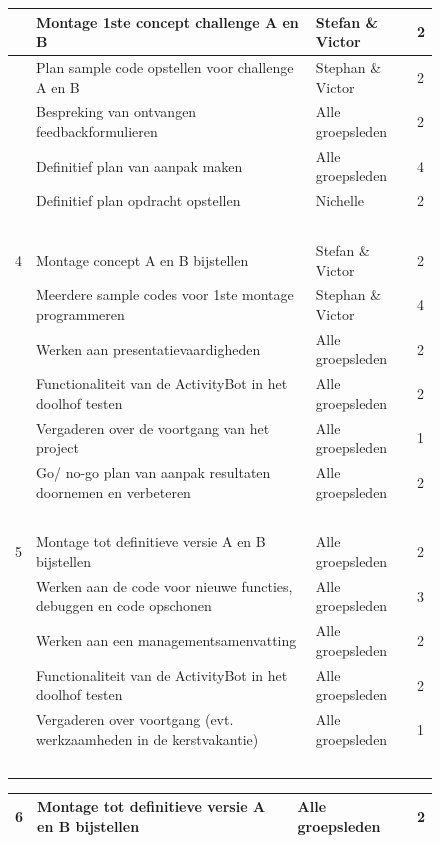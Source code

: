 \documentclass[oneside]{book}
\begin{document}
{\begin{figure}[H]
\begin{adjustwidth}{-4.25cm}{}
\begin{tabular}{ | l | l | l | l | }
	 & Montage 1ste concept challenge A en B & Stefan \& Victor & 2 \\ \hline
	 & Plan sample code opstellen voor challenge A en B & Stephan \& Victor & 2 \\ \hline
	 & Bespreking van ontvangen feedbackformulieren & Alle groepsleden & 2 \\ \hline
	 & Definitief plan van aanpak maken & Alle groepsleden & 4 \\ \hline
	 & Definitief plan opdracht opstellen & Nichelle & 2 \\ \hline
	 & \  & \  & \  \\ \hline
	4 & Montage concept A en B bijstellen & Stefan \& Victor & 2 \\ \hline
	 & Meerdere sample codes voor 1ste montage programmeren & Stephan \& Victor & 4 \\ \hline
	 & Werken aan presentatievaardigheden & Alle groepsleden & 2 \\ \hline
	 & Functionaliteit van de ActivityBot in het doolhof testen & Alle groepsleden & 2 \\ \hline
	 & Vergaderen over de voortgang van het project & Alle groepsleden & 1 \\ \hline
	 & Go/ no-go plan van aanpak resultaten doornemen en verbeteren & Alle groepsleden & 2 \\ \hline
	 & \  & \  & \  \\ \hline
	5 & Montage tot definitieve versie A en B bijstellen & Alle groepsleden & 2 \\ \hline
	 & Werken aan de code voor nieuwe functies, debuggen en code opschonen & Alle groepsleden & 3 \\ \hline
	 & Werken aan een managementsamenvatting & Alle groepsleden & 2 \\ \hline
	 & Functionaliteit van de ActivityBot in het doolhof testen & Alle groepsleden & 2 \\ \hline
	 & Vergaderen over voortgang (evt. werkzaamheden in de kerstvakantie) & Alle groepsleden & 1 \\ \hline
	 & \  & \  & \  \\ \hline
	\end{tabular}
	\end{adjustwidth}\end{figure}
	\clearpage
	\begin{figure}[H]\begin{adjustwidth}{-3.5cm}{}
	\begin{tabular}{ | l | l | l | l | }
	\hline
	6 & Montage tot definitieve versie A en B bijstellen & Alle groepsleden & 2 \\ \hline

\end{tabular}
\end{adjustwidth}
\end{figure}}
\end{document}
